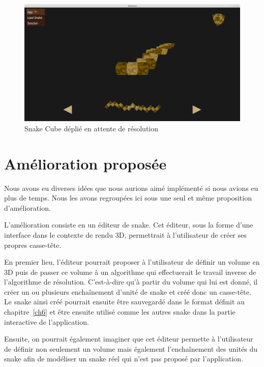 \begin{figure}[h]
 \centering
 \includegraphics[scale=0.3,keepaspectratio=true]{img/screenShot1.png}
 \caption{Snake Cube déplié en attente de résolution}
 \label{screenShot1}
\end{figure}

\section{Amélioration proposée}
Nous avons eu diverses idées que nous aurions aimé implémenté si nous avions eu plus de temps. Nous les avons regroupées ici sous une seul et même proposition d'amélioration.

L'amélioration consiste en un éditeur de snake. Cet éditeur, sous la forme d'une interface dans le contexte de rendu 3D, permettrait à l'utilisateur de créer ses propres casse-tête.

En premier lieu, l'éditeur pourrait proposer à l'utilisateur de définir un volume en 3D puis de passer ce volume à un algorithme qui effectuerait le travail inverse de l'algorithme de résolution. C'est-à-dire qu'à partir du volume qui lui est donné, il créer un ou plusieurs enchaînement d'unité de snake et créé donc un casse-tête. Le snake ainsi créé pourrait ensuite être sauvegardé dans le format définit au chapitre~\ref{ch6} et être ensuite utilisé comme les autres snake dans la partie interactive de l'application.

Ensuite, on pourrait également imaginer que cet éditeur permette à l'utilisateur de définir non seulement un volume mais également l'enchaînement des unités du snake afin de modéliser un snake réel qui n'est pas proposé par l'application.
